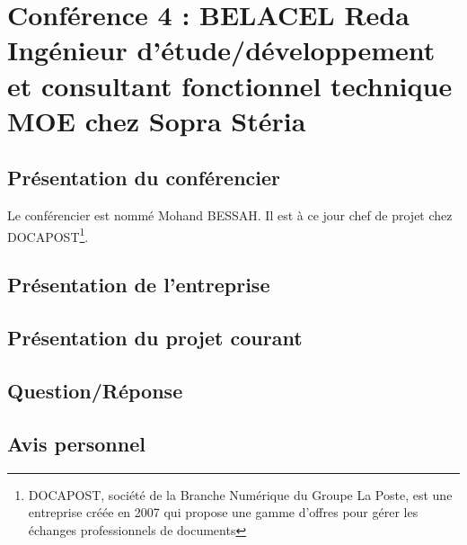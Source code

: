  \section{Conférence 4 : BELACEL Reda Ingénieur d'étude/développement et consultant fonctionnel technique MOE chez Sopra Stéria }
 
 	\subsection{Présentation du conférencier}
 Le conférencier est  nommé Mohand BESSAH. Il est à ce jour chef de projet chez DOCAPOST\footnote{DOCAPOST, société de la Branche Numérique du Groupe La Poste, est une entreprise créée en 2007 qui propose une gamme d’offres pour gérer les échanges professionnels de documents}. 
 	\subsection{Présentation de l'entreprise}
 	\subsection{Présentation du projet courant}
 	\subsection{Question/Réponse}
 	\subsection{Avis personnel} 